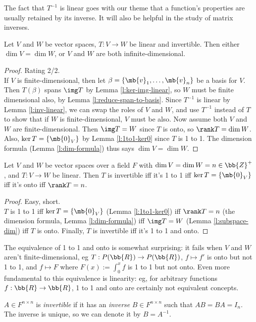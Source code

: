 The fact that $T^{-1}$ is linear goes with our theme that a function's properties are usually retained by its inverse. It will also be helpful in the study of matrix inverses.
\begin{corollary}\label{c:inv-same-dim}
Let $V$ and $W$ be vector spaces, $T:V \to W$ be linear and invertible. Then either $\dim V= \dim W$, or $V$ and $W$ are both infinite-dimensional.
\end{corollary}
\begin{proof}
Rating 2/2.\\
If $V$ is finite-dimensional, then let $\beta= \{ \mb{v}_1, \ldots, \mb{v}_n \}$ be a basis for $V$. Then $T( \beta)$ spans $\img T$ by Lemma \ref{l:ker-img-linear}, so $W$ must be finite dimensional also, by Lemma \ref{l:reduce-span-to-basis}.
Since $T^{-1}$ is linear by Lemma \ref{l:inv-linear}, we can swap the roles of $V$ and $W$, and use $T^{-1}$ instead of $T$ to show that if $W$ is finite-dimensional, $V$ must be also.
Now assume both $V$ and $W$ are finite-dimensional. Then $\img T=W$ since $T$ is onto, so $\rank T= \dim W$. Also, $\ker T= \{ \mb{0}_V \}$ by Lemma \ref{l:1to1-ker0} since $T$ is 1 to 1. The dimension formula (Lemma \ref{l:dim-formula}) thus says $\dim V= \dim W$.
\end{proof}
\begin{lem}\label{l:inv-1to1-or-onto}
Let $V$ and $W$ be vector spaces over a field $F$ with $\dim V= \dim W=n \in \bb{Z}^+$, and $T:V \to W$ be linear. Then $T$ is invertible iff it's 1 to 1 iff $\ker T= \{ \mb{0}_V \}$ iff it's onto iff $\rank T=n$.
\end{lem}
\begin{proof}
Easy, short.\\
$T$ is 1 to 1 iff $\ker T= \{ \mb{0}_V \}$ (Lemma \ref{l:1to1-ker0}) iff $\rank T=n$ (the dimension formula, Lemma \ref{l:dim-formula}) iff $\img T=W$ (Lemma \ref{l:subspace-dim}) iff $T$ is onto. Finally, $T$ is invertible iff it's 1 to 1 and onto.
\end{proof}
The equivalence of 1 to 1 and onto is somewhat surprising: it fails when $V$ and $W$ aren't finite-dimensional, eg $T:P( \bb{R}) \to P( \bb{R})$, $f \mapsto f'$ is onto but not 1 to 1, and $f \mapsto F$ where $F(x):= \int_0^xf$ is 1 to 1 but not onto.
Even more fundamental to this equivalence is linearity: eg, for arbitrary functions $f: \bb{R}\to \bb{R}$, 1 to 1 and onto are certainly not equivalent concepts.
\begin{defn}
$A \in F^{n \times n}$ is \emph{invertible} if it has an \emph{inverse} $B \in F^{n \times n}$ such that $AB=BA=I_n$. The inverse is unique, so we can denote it by $B=A^{-1}$.
\end{defn}
